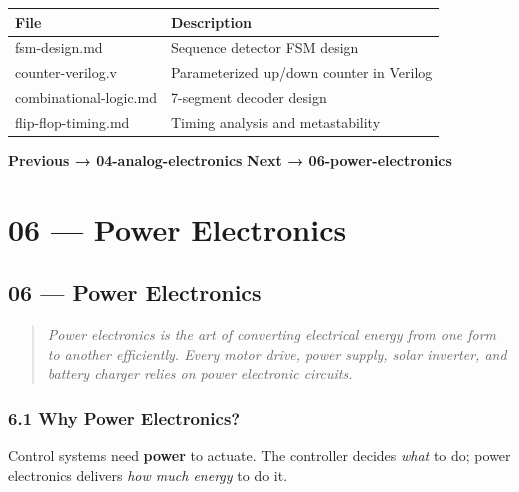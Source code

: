 \documentclass[11pt,a4paper]{book}
\begin{document}
\begin{center}
\begin{tabular}{|l|l|}
\hline
File & Description \\
\hline
fsm-design.md & Sequence detector FSM design \\
counter-verilog.v & Parameterized up/down counter in Verilog \\
combinational-logic.md & 7-segment decoder design \\
flip-flop-timing.md & Timing analysis and metastability \\
\hline
\end{tabular}
\end{center}

\medskip\noindent\hrulefill\medskip

\textbf{Previous → 04-analog-electronics}  
\textbf{Next → 06-power-electronics}


\chapter{06 — Power Electronics}
\section{06 — Power Electronics}

\begin{quote}
\textit{Power electronics is the art of converting electrical energy from one form to another efficiently. Every motor drive, power supply, solar inverter, and battery charger relies on power electronic circuits.}
\end{quote}

\medskip\noindent\hrulefill\medskip

\subsection{6.1 Why Power Electronics?}

Control systems need \textbf{power} to actuate. The controller decides \textit{what} to do; power electronics delivers \textit{how much energy} to do it.

\end{document}
